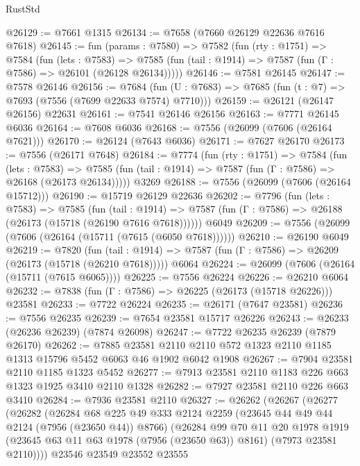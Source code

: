 \begin{lexlean}{RustStd}
\begin{coremodule}
@26129 := @7661 @1315
@26134 := @7658 (@7660 @26129 @22636 @7616 @7618)
@26145 := fun (params : @7580) =>
  @7582
    (fun (rty : @1751) =>
    @7584
      (fun (lets : @7583) =>
      @7585 (fun (tail : @1914) => @7587 (fun (Γ : @7586) => @26101 (@26128 @26134)))))
@26146 := @7581 @26145
@26147 := @7578 @26146
@26156 := @7684
    (fun (U : @7683) => @7685 (fun (t : @7) => @7693 (@7556 (@7699 @22633 @7574) @7710)))
@26159 := @26121 (@26147 @26156) @22631
@26161 := @7541 @26146 @26156
@26163 := @7771 @26145 @6036
@26164 := @7608 @6036
@26168 := @7556 (@26099 (@7606 (@26164 @7621)))
@26170 := @26124 (@7643 @6036)
@26171 := @7627 @26170
@26173 := @7556 (@26171 @7648)
@26184 := @7774
    (fun (rty : @1751) =>
    @7584
      (fun (lets : @7583) =>
      @7585 (fun (tail : @1914) => @7587 (fun (Γ : @7586) => @26168 (@26173 @26134)))))
    @3269
@26188 := @7556 (@26099 (@7606 (@26164 @15712)))
@26190 := @15719 @26129 @22636
@26202 := @7796
    (fun (lets : @7583) =>
    @7585
      (fun (tail : @1914) =>
      @7587 (fun (Γ : @7586) => @26188 (@26173 (@15718 (@26190 @7616 @7618))))))
    @6049
@26209 := @7556 (@26099 (@7606 (@26164 (@15711 (@7615 (@6050 @7618))))))
@26210 := @26190 @6049
@26219 := @7820
    (fun (tail : @1914) => @7587 (fun (Γ : @7586) => @26209 (@26173 (@15718 (@26210 @7618)))))
    @6064
@26224 := @26099 (@7606 (@26164 (@15711 (@7615 @6065))))
@26225 := @7556 @26224
@26226 := @26210 @6064
@26232 := @7838 (fun (Γ : @7586) => @26225 (@26173 (@15718 @26226))) @23581
@26233 := @7722 @26224
@26235 := @26171 (@7647 @23581)
@26236 := @7556 @26235
@26239 := @7654 @23581 @15717 @26226
@26243 := @26233 (@26236 @26239) (@7874 @26098)
@26247 := @7722 @26235 @26239 (@7879 @26170)
@26262 := @7885
    @23581
    @2110
    @2110
    @572
    @1323
    @2110
    @1185
    @1313
    @15796
    @5452
    @6063
    @46
    @1902
    @6042
    @1908
@26267 := @7904 @23581 @2110 @1185 @1323 @5452
@26277 := @7913 @23581 @2110 @1183 @226 @663 @1323 @1925 @3410 @2110 @1328
@26282 := @7927 @23581 @2110 @226 @663 @3410
@26284 := @7936 @23581 @2110
@26327 := @26262
    (@26267
      (@26277
        (@26282
          (@26284
            @68
            @225
            @49
            @333
            @2124
            @2259
            (@23645 @44 @49 @44 @2124 (@7956 (@23650 @44)) @8766)
            (@26284
              @99
              @70
              @11
              @20
              @1978
              @1919
              (@23645 @63 @11 @63 @1978 (@7956 (@23650 @63)) @8161)
              (@7973 @23581 @2110))))
        @23546
        @23549
        @23552
        @23555

\end{coremodule}
\end{lexlean}
